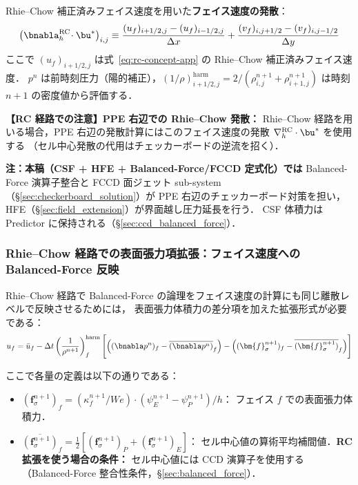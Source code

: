 Rhie--Chow 補正済みフェイス速度を用いた\textbf{フェイス速度の発散}：
\begin{equation}
  \bigl(\bnabla_h^{\mathrm{RC}}\!\cdot\bu^*\bigr)_{i,j}
  \equiv
  \frac{(u_f)_{i+1/2,j} - (u_f)_{i-1/2,j}}{\Delta x}
  + \frac{(v_f)_{i,j+1/2} - (v_f)_{i,j-1/2}}{\Delta y}
  \label{eq:rc_divergence}
\end{equation}
ここで $(u_f)_{i+1/2,j}$ は式~\eqref{eq:rc-concept-app} の Rhie--Chow 補正済みフェイス速度．
$p^n$ は前時刻圧力（陽的補正），$(1/\rho)^{\mathrm{harm}}_{i+1/2,j} = 2/(\rho^{n+1}_{i,j}+\rho^{n+1}_{i+1,j})$
は時刻 $n+1$ の密度値から評価する．

\noindent\textbf{【RC 経路での注意】PPE 右辺での Rhie--Chow 発散：}
Rhie--Chow 経路を用いる場合，PPE 右辺の発散計算にはこのフェイス速度の発散 $\nabla_h^{\mathrm{RC}}\cdot\bu^*$
を使用する
（セル中心発散の代用はチェッカーボードの逆流を招く）．

\noindent\textbf{注：本稿（CSF + HFE + Balanced-Force/FCCD 定式化）では}
Balanced-Force 演算子整合と FCCD 面ジェット sub-system（§\ref{sec:checkerboard_solution}）が
PPE 右辺のチェッカーボード対策を担い，
HFE（§\ref{sec:field_extension}）が界面越し圧力延長を行う．
CSF 体積力は Predictor に保持される（§\ref{sec:ccd_balanced_force}）．

\subsubsection{Rhie--Chow 経路での表面張力項拡張：フェイス速度への Balanced-Force 反映}
\label{app:rc_balanced_force}
\label{app:csf_balanced_force}

Rhie--Chow 経路で Balanced-Force の論理をフェイス速度の計算にも同じ離散レベルで反映させるためには，
表面張力体積力の差分項を加えた拡張形式が必要である：
\begin{equation}
  u_f = \bar{u}_f
    - \Delta t\left(\frac{1}{\rho^{n+1}}\right)_f^{\mathrm{harm}}
    \Biggl[
      \Bigl((\bnabla p^n)_f - \overline{(\bnabla p^n)}_f\Bigr)
      - \Bigl((\bm{f}_\sigma^{n+1})_f - \overline{(\bm{f}_\sigma^{n+1})}_f\Bigr)
    \Biggr]
  \label{eq:rc-face-balanced-app}
\end{equation}

ここで各量の定義は以下の通りである：
\begin{itemize}
  \item $(\bm{f}_\sigma^{n+1})_f = (\kappa_f^{n+1}/We)\cdot(\psi_E^{n+1}-\psi_P^{n+1})/h$：
        フェイス $f$ での表面張力体積力．
  \item $\overline{(\bm{f}_\sigma^{n+1})}_f = \tfrac{1}{2}[(\bm{f}_\sigma^{n+1})_P + (\bm{f}_\sigma^{n+1})_E]$：
        セル中心値の算術平均補間値．\textbf{RC 拡張を使う場合の条件：} セル中心値には CCD 演算子を使用する
        （Balanced-Force 整合性条件，§\ref{sec:balanced_force}）．
\end{itemize}

